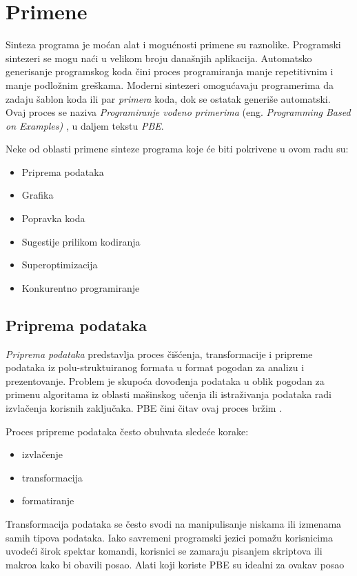 \section{Primene}
\label{sec:Primene}

Sinteza programa je moćan alat i mogućnosti primene su raznolike. Programski sintezeri se mogu naći u velikom broju današnjih aplikacija. Automatsko generisanje programskog koda čini proces programiranja manje repetitivnim i manje podložnim greškama. Moderni sintezeri omogućavaju programerima da zadaju šablon koda ili par \emph{primera} koda, dok se ostatak generiše automatski. Ovaj proces se naziva \emph{Programiranje vođeno primerima} (eng. \emph{Programming Based on Examples)} \cite{PBE}, u daljem tekstu \emph{PBE}.

Neke od oblasti primene sinteze programa koje će biti pokrivene u ovom radu su:
\begin{itemize}
    \item Priprema podataka
    \item Grafika
    \item Popravka koda
    \item Sugestije prilikom kodiranja
    \item Superoptimizacija
    \item Konkurentno programiranje
\end{itemize}


\subsection{Priprema podataka}
\label{subsec:PripremaPodataka}

\emph{Priprema podataka} predstavlja proces čišćenja, transformacije i pripreme podataka iz polu-struktuiranog formata u format pogodan za analizu i prezentovanje. Problem je skupoća dovođenja podataka u oblik pogodan za primenu algoritama iz oblasti mašinskog učenja ili istraživanja podataka radi izvlačenja korisnih zaključaka. PBE čini čitav ovaj proces bržim \cite{PBE}.

Proces pripreme podataka često obuhvata sledeće korake:
\begin{itemize}
  \item izvlačenje
  \item transformacija
  \item formatiranje
\end{itemize}

Transformacija podataka se često svodi na manipulisanje niskama ili izmenama samih tipova podataka. Iako savremeni programski jezici pomažu korisnicima uvodeći širok spektar komandi, korisnici se zamaraju pisanjem skriptova ili makroa kako bi obavili posao. Alati koji koriste PBE su idealni za ovakav posao \cite{PBE, SynthesizingNumberTransformationsFromIOExamples}

